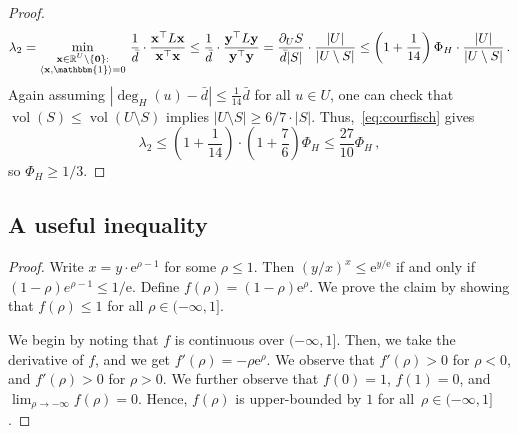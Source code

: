 \documentclass[epsfig,letter,11pt]{article}
\numberwithin{equation}{section}
\DeclareMathOperator{\vol}{vol}
\newcommand\vt[1]{\mathbf{#1}}
\newcommand{\uncut}[2]{{\partial}_{#2} #1}
\DeclareMathOperator{\ind}{\mathbbm{1}}
\newcommand{\e}{\mathrm{e}}
\begin{document}
\begin{proof}
	\begin{align}
		\label{eq:courfisch}
		\lambda_2 = \min_{\substack{\vt{x} \in \mathbb{R}^U\setminus \{\vt{0}\}:\\ \langle \vt{x}, \ind \rangle= 0}} \, \frac{1}{\bar{d}} \cdot \frac{\vt{x}^\top L\vt{x}}{ \vt{x}^\top \vt{x}} \le \frac{1}{\bar{d}} \cdot  \frac{\vt{y}^\top L\vt{y}}{\vt{y}^\top \vt{y}}  = \frac{\uncut{S}{U}}{\bar{d}|S|} \cdot \frac{|U|}{|U\setminus S|}  \le \left(1+\frac{1}{14}\right)\Phi_H \cdot \frac{|U|}{|U\setminus S|} \, .
	\end{align}
	Again assuming $\left|\deg_H(u)-\bar{d}\right|\le \frac{1}{14} \bar{d}$ for all $u \in U$, one can check that $\vol(S) \le \vol(U\setminus S)$ implies $|U\setminus S| \ge 6/7 \cdot |S|$. Thus,~\eqref{eq:courfisch} gives
	\begin{equation*}
		\lambda_2 \le \left(1+\frac{1}{14}\right)\cdot \left(1+\frac{7}{6}\right) \Phi_H \le \frac{27}{10} \Phi_H \, ,
	\end{equation*}
	so $\Phi_H \ge 1/3$.
\end{proof}

\subsection{A useful inequality}
\label{apndx:ineq}
\math*
\begin{proof}
	Write $x=y\cdot \e^{\rho-1}$ for some $\rho \le 1$. Then $(y/x)^x \le \e^{y/\e}$ if and only if $(1-\rho)e^{\rho-1} \le 1/\e$. Define $f(\rho)=(1-\rho)\e^{\rho}$. We prove the claim by showing that $f(\rho) \le 1$ for all $ \rho \in (-\infty, 1]$.
	
	We begin by noting that $f$ is continuous over $(-\infty, 1]$. Then, we take the derivative of $f$, and we get $f'(\rho)=-\rho \e^\rho$. We observe that $f'(\rho) > 0$ for $\rho <0$, and $f'(\rho) > 0$ for $\rho >0$. We further observe that $f(0) = 1$, $f(1)=0$, and $\lim_{\rho \rightarrow -\infty} f(\rho) = 0$. Hence, $f(\rho)$ is upper-bounded by $1$ for all~$\rho \in (-\infty, 1]$.
\end{proof}
\end{document}
